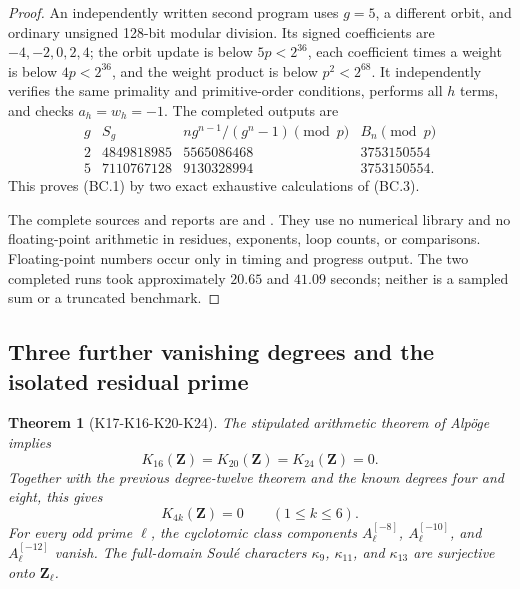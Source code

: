 \documentclass[11pt,a4paper]{article}
\newtheorem{theorem}{Theorem}[section]
\theoremstyle{definition}
\begin{document}
\begin{proof}
An independently written second program uses $g=5$, a different orbit,
and ordinary unsigned 128-bit modular division. Its signed coefficients
are $-4,-2,0,2,4$; the orbit update is below $5p<2^{36}$,
each coefficient times a weight is below $4p<2^{36}$, and the
weight product is below $p^2<2^{68}$. It independently verifies the
same primality and primitive-order conditions, performs all $h$ terms,
and checks $a_h=w_h=-1$. The completed outputs are
\[
\begin{array}{c|r|r|r}
g&S_g&n g^{n-1}/(g^n-1)\pmod p&B_n\pmod p\\ \hline
2&4849818985&5565086468&3753150554\\
5&7110767128&9130328994&3753150554.
\end{array}
\]
This proves (BC.1) by two exact exhaustive calculations of (BC.3).

The complete sources and reports are
 and
.
They use no numerical library and no floating-point arithmetic in
residues, exponents, loop counts, or comparisons.
Floating-point numbers occur only in timing and progress output.
The two completed runs took approximately $20.65$ and $41.09$ seconds;
neither is a sampled sum or a truncated benchmark.
\end{proof}

\subsection{Three further vanishing degrees and the isolated residual prime}
\label{sec:higher-k-vanishing}

\begin{theorem}[K17-K16-K20-K24]\label{thm:higher-k-vanish}
The stipulated arithmetic theorem of Alp\"oge implies
\[
 K_{16}(\mathbf Z)=K_{20}(\mathbf Z)=K_{24}(\mathbf Z)=0.
\]
Together with the previous degree-twelve theorem and the known degrees
four and eight, this gives
\[
                  K_{4k}(\mathbf Z)=0\qquad(1\le k\le6).
 \tag{HK.1}
\]
For every odd prime $\ell$, the cyclotomic class components
$A_\ell^{[-8]}$, $A_\ell^{[-10]}$, and $A_\ell^{[-12]}$ vanish.
The full-domain Soul\'e characters $\kappa_9$, $\kappa_{11}$, and
$\kappa_{13}$ are surjective onto $\mathbf Z_\ell$.
\end{theorem}
\end{document}
